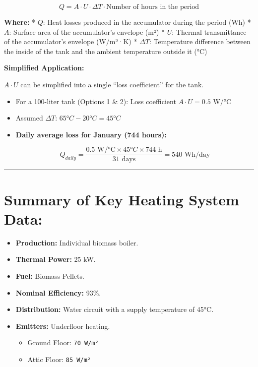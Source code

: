 \documentclass[
  10pt,
  letterpaper,
]{scrbook}
\providecommand{\tightlist}{%
  \setlength{\itemsep}{0pt}\setlength{\parskip}{0pt}}
\begin{document}
\[Q = A \cdot U \cdot \Delta T \cdot \text{Number of hours in the period}\]

\textbf{Where:} * \(Q\): Heat losses produced in the accumulator during
the period (Wh) * \(A\): Surface area of the accumulator's envelope (m²)
* \(U\): Thermal transmittance of the accumulator's envelope (W/m²·K) *
\(\Delta T\): Temperature difference between the inside of the tank and
the ambient temperature outside it (°C)

\textbf{Simplified Application:}

\(A \cdot U\) can be simplified into a single ``loss coefficient'' for
the tank.

\begin{itemize}
\item
  For a 100-liter tank (Options 1 \& 2): Loss coefficient
  \(A \cdot U = 0.5\) W/°C
\item
  Assumed \(\Delta T\): \(65°C - 20°C = 45°C\)
\item
  \textbf{Daily average loss for January (744 hours):}

  \[Q_{daily} = \frac{0.5 \text{ W/°C} \times 45°C \times 744 \text{ h}}{31 \text{ days}} = 540 \text{ Wh/day}\]
\end{itemize}

\begin{center}\rule{0.5\linewidth}{0.5pt}\end{center}

\section{Summary of Key Heating System
Data:}\label{summary-of-key-heating-system-data}

\begin{itemize}
\tightlist
\item
  \textbf{Production:} Individual biomass boiler.
\item
  \textbf{Thermal Power:} 25 kW.
\item
  \textbf{Fuel:} Biomass Pellets.
\item
  \textbf{Nominal Efficiency:} 93\%.
\item
  \textbf{Distribution:} Water circuit with a supply temperature of
  45°C.
\item
  \textbf{Emitters:} Underfloor heating.

  \begin{itemize}
  \tightlist
  \item
    Ground Floor: \texttt{70\ W/m²}
  \item
    Attic Floor: \texttt{85\ W/m²}
  \end{itemize}
\end{itemize}
\end{document}

